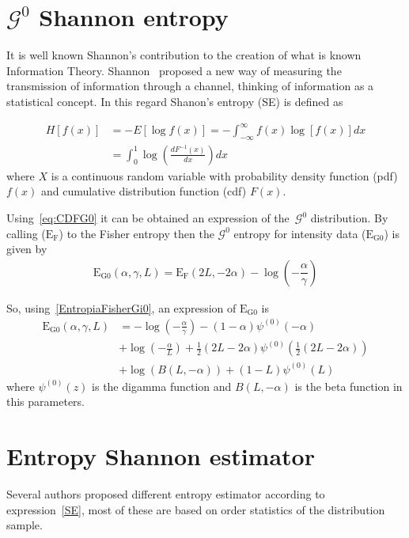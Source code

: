 \documentclass[journal]{IEEEtran}
\begin{document}
\section{$\mathcal{G}^0$ Shannon entropy}
It is well known Shannon's contribution to the creation of what is known Information Theory. Shannon~\cite{Shannon1948} proposed a new way of
measuring the transmission of information through a channel, thinking of information as a statistical concept. In this regard Shanon's entropy (SE) is defined as

\begin{align}
	\label{SE}
	H[f(x)]&=-E[\log f(x)]=-\int_{-\infty}^{\infty} f(x) \log [f(x)] d x\\
	       &= \int_{0}^{1} \log \left(\frac{d F^{-1}(x)}{d x}\right) d x
\end{align}
where $X$ is a continuous random variable with probability density function (pdf) $f(x)$ and
cumulative distribution function (cdf) $F(x)$. 

Using~\eqref{eq:CDFG0} it can be obtained an expression of the~$\mathcal{G}^0$ distribution. By calling ($\text{E}_{\text{F}}$) to the Fisher entropy then the $\mathcal{G}^0$ entropy for intensity data ($\text{E}_{\text{G0}}$) is given by
\begin{align}
	\label{EntropiaFisherGi0}
	\text{E}_{\text{G0}}(\alpha,\gamma,L)=\text{E}_{\text{F}}(2 L, - 2 \alpha) -\log(-\dfrac{\alpha}{\gamma})
\end{align}

So, using~\eqref{EntropiaFisherGi0}, an expression of $\text{E}_{\text{G0}}$ is
\begin{align}
	\label{EG0}
	\text{E}_{\text{G0}}(\alpha,\gamma,L)&=-\log \left(-\frac{\alpha }{\gamma }\right)-(1-\alpha ) \psi^{(0)}(-\alpha )\\ \nonumber
	&+\log \left(-\frac{\alpha }{L}\right)+\frac{1}{2} (2 L-2 \alpha ) \psi ^{(0)}\left(\frac{1}{2} (2 L-2 \alpha )\right)\\ \nonumber
	&+\log (B(L,-\alpha ))+(1-L) \psi^{(0)}(L)
\end{align}
where $\psi^{(0)}(z)$ is the digamma function and $B(L,-\alpha )$ is the beta function in this parameters.

\section{Entropy Shannon estimator}
Several authors proposed different entropy estimator according to expression~\eqref{SE}, most of these are based on order statistics of the distribution sample. 
\end{document}
